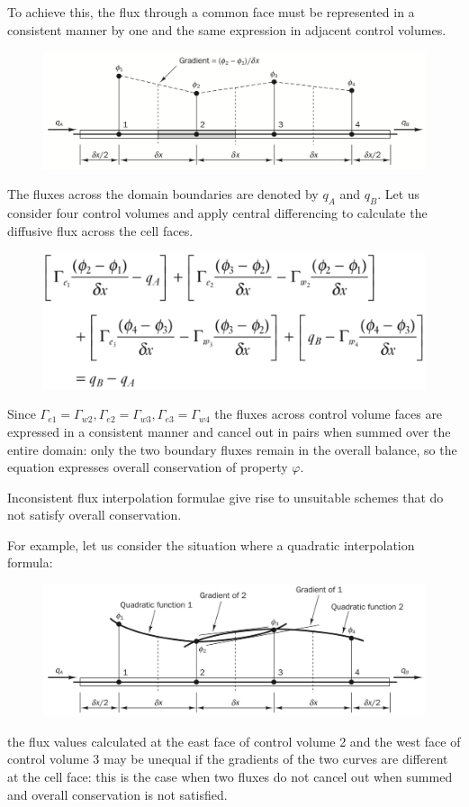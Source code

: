 \documentclass[a4paper, 15pt]{article}
\begin{document}
To
achieve this, the flux through a common face must be represented in a consistent manner by one and the same expression in adjacent control volumes.
\begin{figure}[H]
	\centering
	\includegraphics[width=0.5\linewidth]{fig/screenshot011}
	\label{fig:screenshot011}
\end{figure}
The
fluxes across the domain boundaries are denoted by $q_A$ and $q_B$. Let us consider four control
volumes and apply central differencing to calculate the diffusive flux across the cell faces.
\begin{figure}[H]
	\centering
	\includegraphics[width=0.5\linewidth]{fig/screenshot012}
	\label{fig:screenshot012}
\end{figure}

Since $\Gamma_{e1} = \Gamma_{w2}, \Gamma_{e2} = \Gamma_{w3}, \Gamma_{e3} = \Gamma_{w4}$ the fluxes across control volume faces are expressed in a
consistent manner and cancel out in pairs when summed over the entire domain: only
the two boundary fluxes remain in the overall balance, so the equation expresses
overall conservation of property $\varphi$. \newline 

Inconsistent
flux interpolation formulae give rise to unsuitable schemes that do not satisfy
overall conservation.

For
example, let us consider the situation where a quadratic interpolation formula:
\begin{figure}[H]
	\centering
	\includegraphics[width=0.5\linewidth]{fig/screenshot013}
	\label{fig:screenshot013}
\end{figure}
the flux values calculated at the east face of control volume 2 and the west face of
control volume 3 may be unequal if the gradients of the two curves are different at the cell face: this is the case when two fluxes do not cancel out when summed and overall conservation is not
satisfied. 
\end{document}
